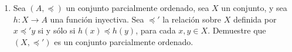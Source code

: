 \documentclass[letterpaper,11pt]{article}
\begin{document}
\begin{enumerate}
    \item Sea $(A, \preceq)$ un conjunto parcialmente ordenado, sea $X$ un 
    conjunto, y sea $h: X → A$ una función inyectiva. Sea $\preceq'$ la 
    relación sobre $X$ definida por $x \preceq' y$ si y sólo si $h(x) 
    \preceq h(y)$, para cada $x, y \in X$. Demuestre que $(X, \preceq')$ es 
    un conjunto parcialmente ordenado.
\end{enumerate}
\end{document}
